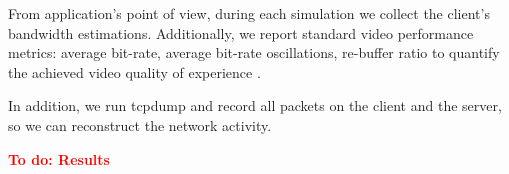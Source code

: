 \documentclass[10pt,sigconf]{acmart}
\newcommand{\todo}[1]{\textbf{\textcolor{red}{To do: #1}}}
\newcommand{\idea}[1]{{\textcolor{blue}{#1}}}
\begin{document}
From application's point of view, during each simulation we collect the client's bandwidth estimations. Additionally, we report standard video performance metrics: average bit-rate, average bit-rate oscillations, re-buffer ratio to quantify the achieved video quality of experience \cite{Spiteri-2019-from-theory-to-practice-sabre, Yin-2015-a-control-theoritic-approach, Dobrian-2013-understanding-the-impact-of-video-quality}.

In addition, we run tcpdump and record all packets on the client and the server, so we can reconstruct the network activity.


\todo{Results}





\end{document}
